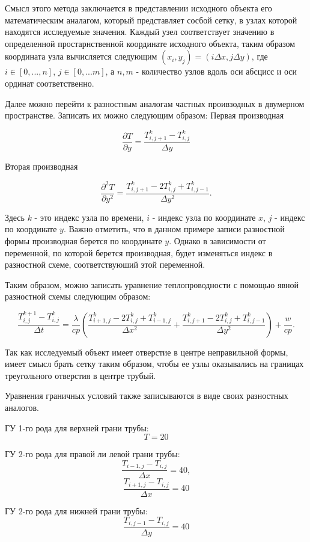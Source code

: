 \documentclass[12pt, a4paper]{article}
\begin{document}
	Смысл этого метода заключается в представлении исходного объекта его математическим аналагом, который представляет сосбой сетку, в узлах которой находятся исследуемые значения. Каждый узел соответствует значению в определенной простарнственной координате исходного объекта, таким образом координата узла вычисляется следующим $(x_i, y_j) = (i\Delta x, j\Delta y)$, где $i \in [0, ..., n]$, $j \in [0, ... m]$, а $n, m$ - количество узлов вдоль оси абсцисс и оси ординат соответственно.
	
	Далее можно перейти к разностным аналогам частных проивзодных в двумерном пространстве. Записать их можно следующим образом:
	Первая производная
	
	\[
	\frac{\partial T}{\partial y} = \frac{T^k_{i, j + 1} - T^k_{i,j}}{\Delta y}
	\]
	
	Вторая производная
	
	\[
	\frac{\partial^2 T}{\partial y^2} = \frac{T^k_{i, j + 1} - 2T^k_{i,j} + T^k_{i,j-1}}{\Delta y^2}.
	\]
	
	Здесь $k$ - это индекс узла по времени, $i$ - индекс узла по координате $x$, $j$ - индекс по координате $y$.
	Важно отметить, что в данном примере записи разностной формы производная берется по координате $y$. Однако в зависимости от переменной, по которой берется производная, будет изменяться индекс в разностной схеме, соответствуюший этой переменной.
	
	Таким образом, можно записать уравнение теплопроводности с помощью явной разностной схемы следующим образом:
	
	\[
	\frac{T^{k + 1}_{i, j} - T^k_{i,j}}{\Delta t} = \frac{\lambda}{cp} \left( \frac{T^k_{i + 1, j} - 2T^k_{i,j} + T^k_{i - 1,j}}{\Delta x^2} + \frac{T^k_{i, j + 1} - 2T^k_{i,j} + T^k_{i,j-1}}{\Delta y^2} \right) + \frac{w}{cp}.
	\]
	
	Так как исследуемый объект имеет отверстие в центре неправильной формы, имеет смысл брать сетку таким образом, чтобы ее узлы оказывались на границах треугольного отверстия в центре трубый.
	
	Уравнения граничных условий также записываются в виде своих разностных аналогов.
	
	ГУ 1-го рода для верхней грани трубы:
	\[
	T = 20
	\]
	
	ГУ 2-го рода для правой ли левой грани трубы:
	\[
	\frac{T_{i-1,j} - T_{i,j}}{\Delta x} = 40,
	\]
	\[
	\frac{T_{i+1,j} - T_{i,j}}{\Delta x} = 40
	\]
	
	ГУ 2-го рода для нижней грани трубы:
	\[
	\frac{T_{i,j-1} - T_{i,j}}{\Delta y} = 40
	\]
	
\end{document}
